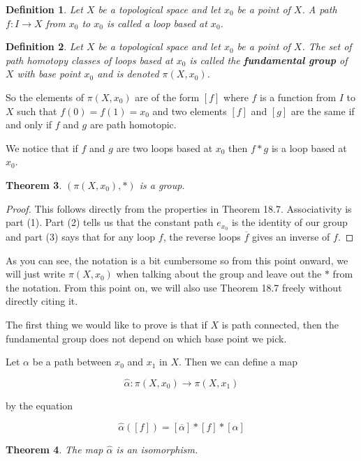\documentclass[a4paper]{article}
\newtheorem{theorem}{Theorem}
\newtheorem{definition}[theorem]{Definition}
\numberwithin{theorem}{section}
\begin{document}
\begin{definition}
Let $X$ be a topological space and let $x_0$ be a point of $X$. A path $f: I \rightarrow X$ from $x_0$ to $x_0$ is called a loop based at $x_0$.
\end{definition}

\begin{definition}
Let $X$ be a topological space and let $x_0$ be a point of $X$. The set of path homotopy classes of loops based at $x_0$ is called the \textbf{fundamental group} of $X$ with base point $x_0$ and is denoted $\pi(X,x_0)$. 
\end{definition}

So the elements of $\pi(X,x_0)$ are of the form $[f]$ where $f$ is a function from $I$ to $X$ such that $f(0)=f(1)=x_0$ and two elements $[f]$ and $[g]$ are the same if and only if $f$ and $g$ are path homotopic.

We notice that if $f$ and $g$ are two loops based at $x_0$ then $f \ast g$ is a loop based at $x_0$. 

\begin{theorem}
$(\pi(X,x_0),\ast) $ is a group.
\end{theorem}

\begin{proof}
This follows directly from the properties in Theorem 18.7. Associativity is part (1). Part (2) tells us that the constant path $e_{x_0}$ is the identity of our group and part (3) says that for any loop $f$, the reverse loops $\overline{f}$ gives an inverse of $f$.
\end{proof}

As you can see, the notation is a bit cumbersome so from this point onward, we will just write $\pi(X,x_0)$ when talking about the group and leave out the $\ast$ from the notation. From this point on, we will also use Theorem 18.7 freely without directly citing it.

The first thing we would like to prove is that if $X$ is path connected, then the fundamental group does not depend on which base point we pick.

Let $\alpha$ be a path between $x_0$ and $x_1$ in $X$. Then we can define a map 

$$ \hat{\alpha}: \pi(X,x_0) \rightarrow \pi(X,x_1) $$

by the equation

$$ \hat{\alpha} ([f]) = [\overline{\alpha}] \ast [f] \ast [\alpha] $$

\begin{theorem}
The map $\hat{\alpha}$ is an isomorphism.
\end{theorem}
\end{document}
